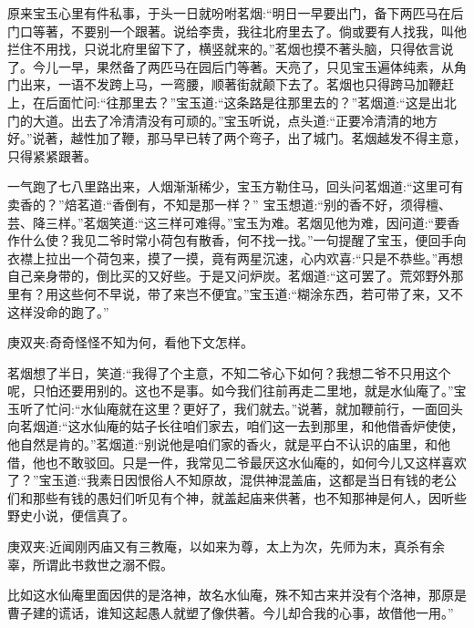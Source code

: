 \begin{parag}
    原来宝玉心里有件私事，于头一日就吩咐茗烟:“明日一早要出门，备下两匹马在后门口等著，不要别一个跟著。说给李贵，我往北府里去了。倘或要有人找我，叫他拦住不用找，只说北府里留下了，横竖就来的。”茗烟也摸不著头脑，只得依言说了。今儿一早，果然备了两匹马在园后门等著。天亮了，只见宝玉遍体纯素，从角门出来，一语不发跨上马，一弯腰，顺著街就颠下去了。茗烟也只得跨马加鞭赶上，在后面忙问:“往那里去？”宝玉道:“这条路是往那里去的？”茗烟道:“这是出北门的大道。出去了冷清清没有可顽的。”宝玉听说，点头道:“正要冷清清的地方好。”说著，越性加了鞭，那马早已转了两个弯子，出了城门。茗烟越发不得主意，只得紧紧跟著。
\end{parag}


\begin{parag}
    一气跑了七八里路出来，人烟渐渐稀少，宝玉方勒住马，回头问茗烟道:“这里可有卖香的？”焙茗道:“香倒有，不知是那一样？” 宝玉想道:“别的香不好，须得檀、芸、降三样。”茗烟笑道:“这三样可难得。”宝玉为难。茗烟见他为难，因问道:“要香作什么使？我见二爷时常小荷包有散香，何不找一找。”一句提醒了宝玉，便回手向衣襟上拉出一个荷包来，摸了一摸，竟有两星沉速，心内欢喜:“只是不恭些。”再想自己亲身带的，倒比买的又好些。于是又问炉炭。茗烟道:“这可罢了。荒郊野外那里有？用这些何不早说，带了来岂不便宜。”宝玉道:“糊涂东西，若可带了来，又不这样没命的跑了。”\begin{note}庚双夹:奇奇怪怪不知为何，看他下文怎样。\end{note}茗烟想了半日，笑道:“我得了个主意，不知二爷心下如何？我想二爷不只用这个呢，只怕还要用别的。这也不是事。如今我们往前再走二里地，就是水仙庵了。”宝玉听了忙问:“水仙庵就在这里？更好了，我们就去。”说著，就加鞭前行，一面回头向茗烟道:“这水仙庵的姑子长往咱们家去，咱们这一去到那里，和他借香炉使使，他自然是肯的。”茗烟道:“别说他是咱们家的香火，就是平白不认识的庙里，和他借，他也不敢驳回。只是一件，我常见二爷最厌这水仙庵的，如何今儿又这样喜欢了？”宝玉道:“我素日因恨俗人不知原故，混供神混盖庙，这都是当日有钱的老公们和那些有钱的愚妇们听见有个神，就盖起庙来供著，也不知那神是何人，因听些野史小说，便信真了。\begin{note}庚双夹:近闻刚丙庙又有三教庵，以如来为尊，太上为次，先师为末，真杀有余辜，所谓此书救世之溺不假。\end{note}比如这水仙庵里面因供的是洛神，故名水仙庵，殊不知古来并没有个洛神，那原是曹子建的谎话，谁知这起愚人就塑了像供著。今儿却合我的心事，故借他一用。”
\end{parag}


